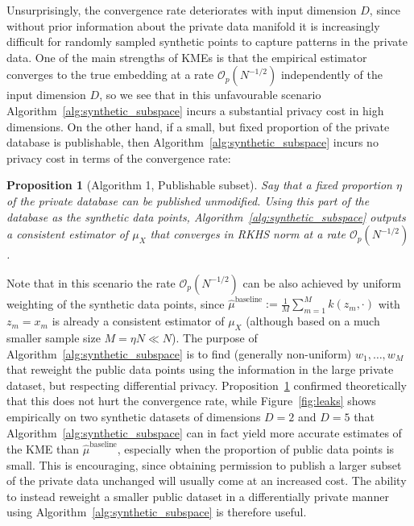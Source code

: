 \documentclass{article}
\newcommand{\calO}{\mathcal{O}}			%
\theoremstyle{plain}
\newtheorem{proposition}[theorem]{Proposition}
\theoremstyle{remark}
\theoremstyle{definition}
\begin{document}
Unsurprisingly, the convergence rate deteriorates with input dimension $D$, since without prior information about the private data manifold it is increasingly difficult for randomly sampled synthetic points to capture patterns in the private data. One of the main strengths of KMEs is that the empirical estimator converges to the true embedding at a rate $\calO_p(N^{-1/2})$ independently of the input dimension $D$, so we see that in this unfavourable scenario Algorithm~\ref{alg:synthetic_subspace} incurs a substantial privacy cost in high dimensions. On the other hand, if a small, but fixed proportion of the private database is publishable, then Algorithm~\ref{alg:synthetic_subspace} incurs no privacy cost in terms of the convergence rate:

\begin{proposition}[Algorithm 1, Publishable subset]
\label{prop:alg1_rate_publishable_subset}
Say that a fixed proportion $\eta$ of the private database can be published unmodified. Using this part of the database as the synthetic data points, Algorithm~\ref{alg:synthetic_subspace} outputs a consistent estimator of $\mu_X$ that converges in RKHS norm at a rate $\calO_p(N^{-1/2})$.
\end{proposition}

Note that in this scenario the rate $\calO_p(N^{-1/2})$ can be also achieved by uniform weighting of the synthetic data points, since $\hat{\mu}^{\text{baseline}} := \frac{1}{M} \sum_{m = 1}^M k(z_m, \cdot)$ with $z_m = x_m$ is already a consistent estimator of $\mu_X$ (although based on a much smaller sample size $M = \eta N \ll N$). The purpose of Algorithm~\ref{alg:synthetic_subspace} is to find (generally non-uniform) $w_1, \ldots, w_M$ that reweight the public data points using the information in the large private dataset, but respecting differential privacy. Proposition~\ref{prop:alg1_rate_publishable_subset} confirmed theoretically that this does not hurt the convergence rate, while Figure~\ref{fig:leaks} shows empirically on two synthetic datasets of dimensions $D = 2$ and $D = 5$ that Algorithm~\ref{alg:synthetic_subspace} can in fact yield more accurate estimates of the KME than $\hat{\mu}^{\text{baseline}}$, especially when the proportion of public data points is small. This is encouraging, since obtaining permission to publish a larger subset of the private data unchanged will usually come at an increased cost. The ability to instead reweight a smaller public dataset in a differentially private manner using Algorithm~\ref{alg:synthetic_subspace} is therefore useful.
\end{document}
